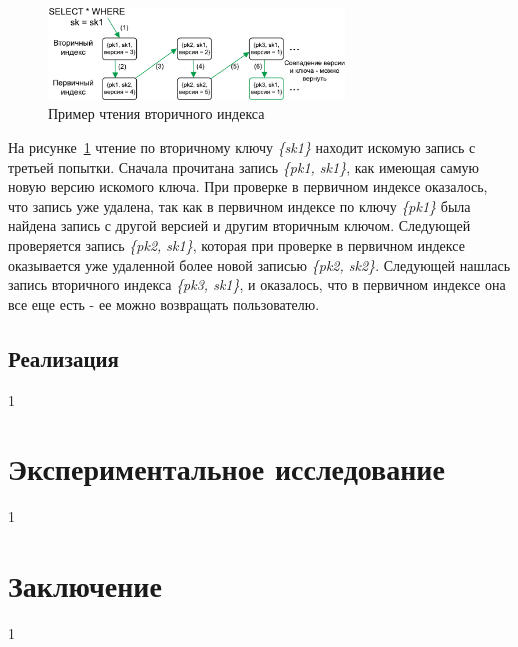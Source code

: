 \documentclass[a4paper,hidelinks,12pt]{article}
\begin{document}
\begin{figure}
\centering
\includegraphics[width=0.7\textwidth]{secondary_reading_example}
\caption{Пример чтения вторичного индекса}
\label{fig:secondary_reading_example}
\end{figure}

На рисунке~\ref{fig:secondary_reading_example} чтение по вторичному ключу
\textit{\{sk1\}} находит искомую запись с третьей попытки. Сначала прочитана
запись \textit{\{pk1, sk1\}}, как имеющая самую новую версию искомого ключа.
При проверке в первичном индексе оказалось, что запись уже удалена, так как в
первичном индексе по ключу \textit{\{pk1\}} была найдена запись с другой версией
и другим вторичным ключом. Следующей проверяется запись \textit{\{pk2, sk1\}},
которая при проверке в первичном индексе оказывается уже удаленной более новой
записью \textit{\{pk2, sk2\}}. Следующей нашлась запись вторичного индекса
\textit{\{pk3, sk1\}}, и оказалось, что в первичном индексе она все еще есть -
ее можно возвращать пользователю.

\subsection{Реализация}
1

\section{Экспериментальное исследование}
1


\section{Заключение}
1
\end{document}
